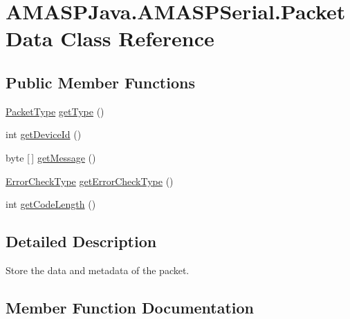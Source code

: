 \hypertarget{class_a_m_a_s_p_java_1_1_a_m_a_s_p_serial_1_1_packet_data}{}\section{A\+M\+A\+S\+P\+Java.\+A\+M\+A\+S\+P\+Serial.\+Packet\+Data Class Reference}
\label{class_a_m_a_s_p_java_1_1_a_m_a_s_p_serial_1_1_packet_data}
\subsection*{Public Member Functions}
\begin{DoxyCompactItemize}
\item 
\hyperlink{enum_a_m_a_s_p_java_1_1_a_m_a_s_p_serial_1_1_packet_type}{Packet\+Type} \hyperlink{class_a_m_a_s_p_java_1_1_a_m_a_s_p_serial_1_1_packet_data_a8a24093b1f2bafdbeb21e616351b4d6c}{get\+Type} ()
\item 
int \hyperlink{class_a_m_a_s_p_java_1_1_a_m_a_s_p_serial_1_1_packet_data_a68c6b5cd80a2c93fb9866d564fd34ec8}{get\+Device\+Id} ()
\item 
byte \mbox{[}$\,$\mbox{]} \hyperlink{class_a_m_a_s_p_java_1_1_a_m_a_s_p_serial_1_1_packet_data_a16431ee191945056369cd2a6159193cc}{get\+Message} ()
\item 
\hyperlink{enum_a_m_a_s_p_java_1_1_a_m_a_s_p_serial_1_1_error_check_type}{Error\+Check\+Type} \hyperlink{class_a_m_a_s_p_java_1_1_a_m_a_s_p_serial_1_1_packet_data_a4ebc049a03062400a06210c8560d625b}{get\+Error\+Check\+Type} ()
\item 
int \hyperlink{class_a_m_a_s_p_java_1_1_a_m_a_s_p_serial_1_1_packet_data_a542fcdebe5f7f41f2d1764bdce06fdfd}{get\+Code\+Length} ()
\end{DoxyCompactItemize}


\subsection{Detailed Description}
Store the data and metadata of the packet. 

\subsection{Member Function Documentation}
\mbox{\label{class_a_m_a_s_p_java_1_1_a_m_a_s_p_serial_1_1_packet_data_a542fcdebe5f7f41f2d1764bdce06fdfd}} 

